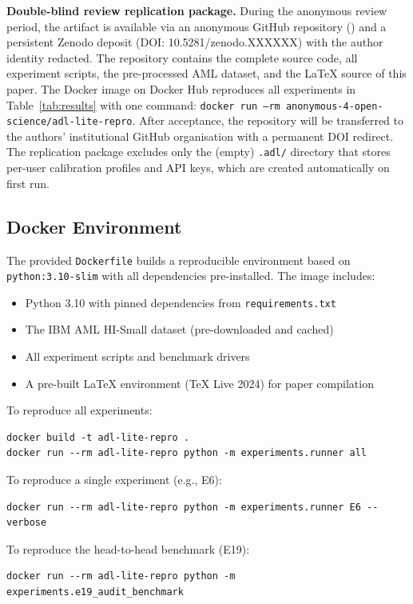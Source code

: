 \textbf{Double-blind review replication package.} During the anonymous review period, the artifact is available via an anonymous GitHub repository () and a persistent Zenodo deposit (DOI: 10.5281/zenodo.XXXXXX) with the author identity redacted. The repository contains the complete source code, all experiment scripts, the pre-processed AML dataset, and the LaTeX source of this paper. The Docker image  on Docker Hub reproduces all experiments in Table~\ref{tab:results} with one command: \texttt{docker run --rm anonymous-4-open-science/adl-lite-repro}. After acceptance, the repository will be transferred to the authors' institutional GitHub organisation with a permanent DOI redirect. The replication package excludes only the (empty) \texttt{.adl/} directory that stores per-user calibration profiles and API keys, which are created automatically on first run.

\subsection{Docker Environment}

The provided \texttt{Dockerfile} builds a reproducible environment based on \texttt{python:3.10-slim} with all dependencies pre-installed. The image includes:
\begin{itemize}[leftmargin=2em]
    \item Python 3.10 with pinned dependencies from \texttt{requirements.txt}
    \item The IBM AML HI-Small dataset (pre-downloaded and cached)
    \item All experiment scripts and benchmark drivers
    \item A pre-built LaTeX environment (TeX Live 2024) for paper compilation
\end{itemize}

To reproduce all experiments:
\begin{verbatim}
docker build -t adl-lite-repro .
docker run --rm adl-lite-repro python -m experiments.runner all
\end{verbatim}

To reproduce a single experiment (e.g., E6):
\begin{verbatim}
docker run --rm adl-lite-repro python -m experiments.runner E6 --verbose
\end{verbatim}

To reproduce the head-to-head benchmark (E19):
\begin{verbatim}
docker run --rm adl-lite-repro python -m experiments.e19_audit_benchmark
\end{verbatim}

